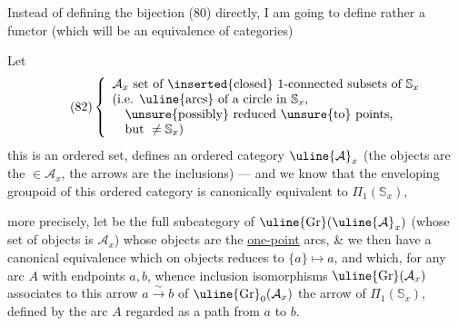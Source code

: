 Instead of defining the bijection (80) directly, I am going to define rather a functor (which will be an equivalence of categories)

Let 
\[
\tag{82}
\left\{
\begin{array}{l}
\mathcal A_x\text{ set of }\inserted{\text{closed}}\text{ }1\text{-connected subsets of }\mathbb S_x\\
(\text{i.e. }\uline{\text{arcs}}\text{ of a circle in }\mathbb S_x,\\
\quad\unsure{\text{possibly}}\text{ reduced }\unsure{\text{to}}\text{ points,}\\
\quad\text{but }\ne\mathbb S_x)
\end{array}
\right.
\]
this is an ordered set,   defines an ordered category $\uline{\mathcal A}_x$ (the objects are the $\in\mathcal A_x$, the arrows are the inclusions) --- and we know that the enveloping groupoid  of this ordered category is canonically equivalent to $\Pi_1(\mathbb S_x)$,



more precisely, let  be the full subcategory of $\uline{\mathrm{Gr}}(\uline{\mathcal A}_x)$ (whose set of objects is $\mathcal A_x$) whose objects are the \uline{one-point} arcs, \& we then have a canonical equivalence
which on objects reduces to $\{a\}\longmapsto a$, and which, for any arc  $A$ with endpoints $a,b$, whence inclusion isomorphisms  $\uline{\mathrm{Gr}}(\mathcal A_x)$
associates to this arrow $a\overset{\sim}{\longrightarrow}b$ of $\uline{\mathrm{Gr}}_0(\mathcal A_x)$ the arrow of $\Pi_1(\mathbb S_x)$, defined by the arc $A$ regarded as a path from $a$ to $b$.

